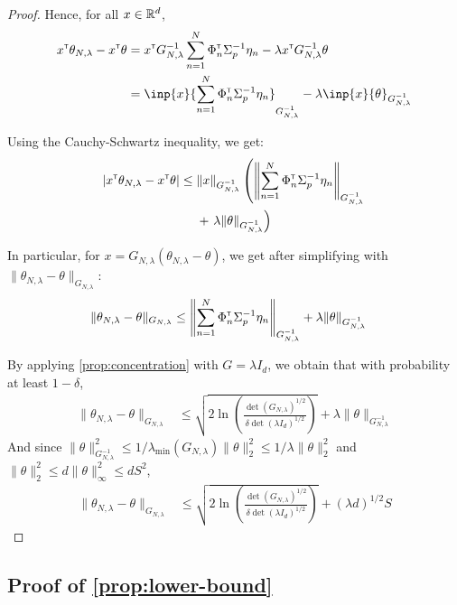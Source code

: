 \documentclass{article}
\begin{document}
\begin{proof}

Hence, for all $x\in\mathbb{R}^d$,
\begin{align*}
    x^\transp\theta_{N,\lambda}  -x^\transp\theta &= x^\transp G_{N, \lambda}^{-1}\sum_{n=1}^N \Phi_n^\transp \Sigma_p^{-1}\eta_n
    - \lambda x^\transp G_{N, \lambda}^{-1}\theta\\
    &= \inp{x}{\sum_{n=1}^N \Phi_n^\transp \Sigma_p^{-1}\eta_n}_{G_{N, \lambda}^{-1}} - \lambda\inp{x}{\theta}_{G_{N, \lambda}^{-1}}
\end{align*}

Using the Cauchy-Schwartz inequality, we get:
\begin{align*}
    |x^{\mathsf{\scriptscriptstyle T}}\theta_{N,\lambda}  -x^{\mathsf{\scriptscriptstyle T}}\theta| \leq {} & \|x\|_{G_{N, \lambda}^{-1}}\left(\left\|\sum_{n=1}^N \Phi_n^{\mathsf{\scriptscriptstyle T}} \Sigma_p^{-1}\eta_n\right\|_{G_{N, \lambda}^{-1}}\right.\\ 
    &+ \left.\lambda\|\theta\|_{G_{N, \lambda}^{-1}}\right)
\end{align*}

In particular, for $x = G_{N,\lambda}(\theta_{N,\lambda} - \theta)$, we get after simplifying with $\| \theta_{N,\lambda}  - \theta\|_{G_{N,\lambda}}$:
\begin{align*}
    \| \theta_{N,\lambda}  - \theta\|_{G_{N,\lambda}} &\leq \left\|\sum_{n=1}^N \Phi_n^{\mathsf{\scriptscriptstyle T}} \Sigma_p^{-1}\eta_n\right\|_{G_{N, \lambda}^{-1}} + \lambda\|\theta\|_{G_{N, \lambda}^{-1}}
\end{align*}

By applying \autoref{prop:concentration} with $G=\lambda I_d$, we obtain that with probability at least $1-\delta$,
\begin{align*}
    \| \theta_{N,\lambda}  - \theta\|_{G_{N,\lambda}} &\leq \sqrt{2\ln \left(\frac{\det(G_{N,\lambda})^{1/2}}{\delta\det(\lambda I_d)^{1/2}}\right)}
     + \lambda\|\theta\|_{G_{N, \lambda}^{-1}}
\end{align*}
And since $\|\theta\|_{G_{N, \lambda}^{-1}}^2 \leq 1/\lambda_{\min}(G_{N,\lambda})\|\theta\|_2^2 \leq 1/\lambda \|\theta\|_2^2$ and $\|\theta\|_2^2 \leq d\|\theta\|_\infty^2\leq d S^2$,
\begin{align*}
    \| \theta_{N,\lambda}  - \theta\|_{G_{N,\lambda}} &\leq \sqrt{2\ln \left(\frac{\det(G_{N,\lambda})^{1/2}}{\delta\det(\lambda I_d)^{1/2}}\right)}
     + (\lambda d)^{1/2}S
\end{align*}
\end{proof}


\subsection{Proof of \autoref{prop:lower-bound}}
\end{document}

